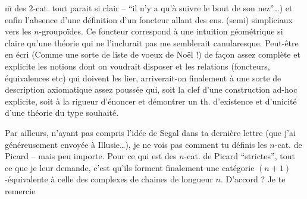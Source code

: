 \={m} des $2$-cat. tout parait si clair -- ``il n'y a qu'à suivre le bout de son nez''\dots) et enfin l'absence d'une définition d'un foncteur allant des ens. (semi) simpliciaux vers les $n$-groupoïdes. Ce foncteur correspond à une intuition géométrique si claire qu'une théorie qui ne l'inclurait pas me semblerait canularesque. Peut-être en écri (Comme une sorte de liste de voeux de Noël !) de façon assez complète et explicite les  notions dont on voudrait disposer et les relations (foncteurs, équivalences etc) qui doivent les lier, arriverait-on finalement à une sorte de description axiomatique assez poussée qui, soit  la clef d'une construction ad-hoc explicite, soit  à la rigueur d'énoncer et démontrer un th. d'existence et d'unicité d'une théorie du type souhaité.

Par ailleurs, n'ayant pas compris l'idée de Segal dans ta dernière lettre (que j'ai généreusement envoyée à Illusie\dots), je ne vois pas comment tu définis les $n$-cat. de Picard -- mais peu importe. Pour ce qui est des $n$-cat. de Picard ``strictes'', tout ce que je leur demande, c'est qu'ils forment finalement une catégorie $(n+1)$-équivalente à celle des complexes de chaines de longueur $n$. D'accord ? Je te remercie
